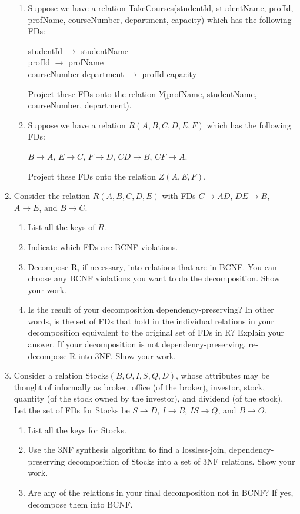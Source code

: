 \documentclass[11pt]{article}
\begin{document}
\begin{enumerate}
\begin{enumerate}
		\item Suppose we have a relation TakeCourses(studentId, studentName, profId, profName, courseNumber, department, capacity)
		which has the following FDs:
		
		studentId $\to$ studentName \\
		profId $\to$ profName \\
		courseNumber department $\to$ profId capacity
		
		Project these FDs onto the relation $Y$(profName, studentName, courseNumber, department).
		
		\item Suppose we have a relation $R(A, B, C, D, E, F)$ which has the following FDs:
		
		$B \to A$, $E \to C$, $F \to D$, $CD \to B$, $CF \to A$.
		
		Project these FDs onto the relation $Z(A, E, F)$.
	\end{enumerate}

\item Consider the relation $R(A, B, C, D, E)$ with FDs $C\to AD$, $DE \to B$, $A \to E$,
	and $B \to C$.
	\begin{enumerate}
		\item List all the keys of $R$.
		\item Indicate which FDs are BCNF violations.
		\item Decompose R, if necessary, into relations that are in BCNF.  You can choose
		any BCNF violations you want to do the decomposition.  Show your work.
		\item Is the result of your decomposition dependency-preserving?  In other words,
		is the set of FDs that hold in the individual relations in your decomposition equivalent
		to the original set of FDs in R?  Explain your answer.  If your decomposition is
		not dependency-preserving, re-decompose R into 3NF.  Show your work.
		
	\end{enumerate}
	
	\item Consider a relation Stocks$(B, O, I, S, Q, D)$, whose attributes may be thought of informally as broker, office (of the broker), investor, stock, quantity (of the stock owned by the investor), and dividend (of the stock). Let the set of FDs for Stocks be $S \to D$, 
	$I \to B$, $IS \to Q$, and $B \to O$.
	
	\begin{enumerate}
		\item List all the keys for Stocks.
		\item Use the 3NF synthesis algorithm to find a lossless-join, dependency-preserving decomposition of Stocks into a set of 3NF relations. Show your work.
		\item Are any of the relations in your final decomposition not in BCNF?  If yes, decompose them into BCNF.
	\end{enumerate}
	

\end{enumerate}
\end{document}
